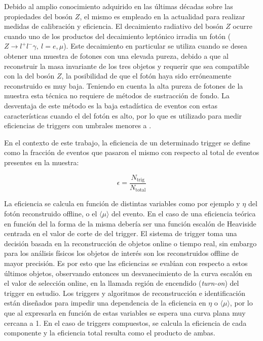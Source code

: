 Debido al amplio conocimiento adquirido en las últimas décadas sobre las propiedades del bosón $Z$, el mismo es empleado en la actualidad para realizar medidas de calibración y eficiencia. El decaimiento radiativo del bosón $Z$ ocurre cuando uno de los productos del decaimiento leptónico irradia un fotón ($Z\to l^{+}l^{-}\gamma,\:l=e,\mu$). Este decaimiento en particular se utiliza cuando se desea obtener una muestra de fotones con una elevada pureza, debido a que al reconstruir la masa invariante de los tres objetos y requerir que sea compatible con la del bosón $Z$, la posibilidad de que el fotón haya sido erróneamente reconstruido es muy baja. Teniendo en cuenta la alta pureza de fotones de la muestra esta técnica no requiere de métodos de sustracción de fondo. La desventaja de este método es la baja estadística de eventos con estas características cuando el \pt del fotón es alto, por lo que es utilizado para medir eficiencias de triggers con umbrales menores a .

En el contexto de este trabajo, la eficiencia de un determinado trigger se define como la fracción de eventos que pasaron el mismo con respecto al total de eventos presentes en la muestra:

\begin{equation}
	\epsilon = \frac{N_\text{trig}}{N_\text{total}}
	\label{eq:trig_eff}
\end{equation}

La eficiencia se calcula en función de distintas variables como por ejemplo \ET y $\eta$ del fotón reconstruido offline, o el $\langle\mu\rangle$ del evento. En el caso de una eficiencia teórica en función del \ET la forma de la misma debería ser una función escalón de Heaviside centrada en el valor de corte de \ET del trigger. El sistema de trigger toma una decisión basada en la reconstrucción de objetos online o tiempo real, sin embargo para los análisis físicos los objetos de interés son los reconstruidos offline de mayor precisión. Es por esto que las eficiencias se evalúan con respecto a estos últimos objetos, observando entonces un desvanecimiento de la curva escalón en el valor de selección online, en la llamada región de encendido (\textit{turn-on}) del trigger en estudio. 
Los triggers y algoritmos de reconstrucción e identificación están diseñados para impedir una dependencia de la eficiencia en $\eta$ o $\langle\mu\rangle$, por lo que al expresarla en función de estas variables se espera una curva plana muy cercana a 1. En el caso de triggers compuestos, se calcula la eficiencia de cada componente y la eficiencia total resulta como el producto de ambas.

